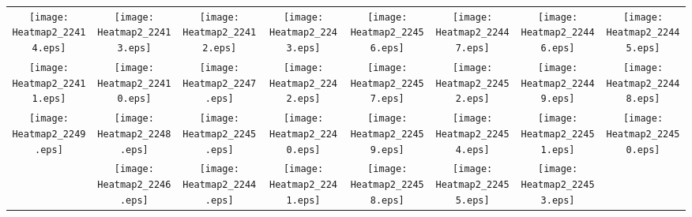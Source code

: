 \documentclass{standalone}
\begin{document}
\begin{tabular}{ *8{c} }
\texttt{[image: Heatmap2\_22414.eps]} & \texttt{[image: Heatmap2\_22413.eps]} & \texttt{[image: Heatmap2\_22412.eps]} & \texttt{[image: Heatmap2\_2243.eps]} & \texttt{[image: Heatmap2\_22456.eps]} & \texttt{[image: Heatmap2\_22447.eps]} & \texttt{[image: Heatmap2\_22446.eps]} & \texttt{[image: Heatmap2\_22445.eps]} \\
\texttt{[image: Heatmap2\_22411.eps]} & \texttt{[image: Heatmap2\_22410.eps]} & \texttt{[image: Heatmap2\_2247.eps]} & \texttt{[image: Heatmap2\_2242.eps]} & \texttt{[image: Heatmap2\_22457.eps]} & \texttt{[image: Heatmap2\_22452.eps]} & \texttt{[image: Heatmap2\_22449.eps]} & \texttt{[image: Heatmap2\_22448.eps]} \\
\texttt{[image: Heatmap2\_2249.eps]} & \texttt{[image: Heatmap2\_2248.eps]} & \texttt{[image: Heatmap2\_2245.eps]} & \texttt{[image: Heatmap2\_2240.eps]} & \texttt{[image: Heatmap2\_22459.eps]} & \texttt{[image: Heatmap2\_22454.eps]} & \texttt{[image: Heatmap2\_22451.eps]} & \texttt{[image: Heatmap2\_22450.eps]} \\
 & \texttt{[image: Heatmap2\_2246.eps]} & \texttt{[image: Heatmap2\_2244.eps]} & \texttt{[image: Heatmap2\_2241.eps]} & \texttt{[image: Heatmap2\_22458.eps]} & \texttt{[image: Heatmap2\_22455.eps]} & \texttt{[image: Heatmap2\_22453.eps]} &  
\end{tabular}
\end{document}
